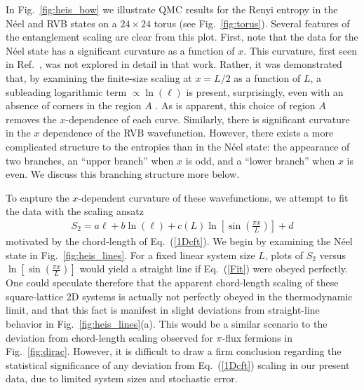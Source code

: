 \documentclass[prl,aps,twocolumn,floatfix,amsmath,amssymb,superscriptaddress,tightenlines]{revtex4}
\begin{document}
In Fig.~{\ref{fig:heis_bow}} we illustrate QMC results for the Renyi entropy in the N\'eel and RVB states on a $24 \times 24$ torus (see Fig.~\ref{fig:torus}).  
Several features of the entanglement scaling are clear from this plot.  First, note that the data for the N\'eel state has a significant curvature as a function of $x$.  This curvature, first seen in Ref.~\cite{HeisLog}, was not explored in detail in that work.  Rather, it was demonstrated that, by examining the finite-size scaling at $x=L/2$ as a function of $L$, a subleading logarithmic term $\propto \ln(\ell)$ is present, surprisingly, even with an absence of corners in the region $A$ \cite{MaxLog}.
As is apparent, this choice of region $A$ removes the $x$-dependence of each curve.  
Similarly, there is significant curvature in the $x$ dependence of the RVB wavefunction.  However, there exists a more complicated structure to the entropies than in the N\'eel state: the appearance of two branches, an ``upper branch'' when $x$ is odd, and a ``lower branch'' when $x$ is even.  We discuss this branching structure more below.

To capture the $x$-dependent curvature of these wavefunctions, we attempt to fit the data with the scaling ansatz
\begin{align}
S_2= a \ell + b\ln(\ell)
+ c(L) \ln \left[{ \sin\left({ \frac{\pi x}{L} }\right) }\right] + d \label{Fit}
\end{align}
motivated by the chord-length of Eq.~(\ref{1Dcft}).
We begin by examining the N\'eel state in Fig.~{\ref{fig:heis_lines}}.  For a fixed linear system size $L$, plots of $S_2$ versus $ \ln \left[{ \sin\left({ \frac{\pi x}{L} }\right) }\right] $ would yield a straight line if Eq.~(\ref{Fit}) were obeyed perfectly.  
One could speculate therefore that the apparent chord-length scaling of these square-lattice 2D systems is actually not perfectly obeyed in the thermodynamic limit, and that this fact is manifest in slight deviations from straight-line behavior in Fig.~{\ref{fig:heis_lines}}(a).
This would be a similar scenario to the deviation from chord-length scaling observed for $\pi$-flux fermions in Fig.~\ref{fig:dirac}.  
However, it is difficult to draw a firm conclusion regarding the statistical significance of any deviation from Eq.~(\ref{1Dcft}) scaling in our
present data, due to limited system sizes and stochastic error.
\end{document}
